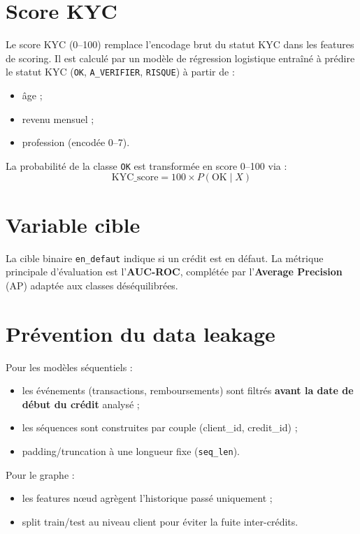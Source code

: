 \section{Score KYC}

Le score KYC (0--100) remplace l'encodage brut du statut KYC dans les features de scoring. Il est calculé par un modèle de régression logistique entraîné à prédire le statut KYC (\texttt{OK}, \texttt{A\_VERIFIER}, \texttt{RISQUE}) à partir de :
\begin{itemize}[leftmargin=*]
  \item âge ;
  \item revenu mensuel ;
  \item profession (encodée 0--7).
\end{itemize}

La probabilité de la classe \texttt{OK} est transformée en score 0--100 via :
\[
\text{KYC\_score} = 100 \times P(\text{OK} \mid X)
\]

\section{Variable cible}

La cible binaire \texttt{en\_defaut} indique si un crédit est en défaut. La métrique principale d'évaluation est l'\textbf{AUC-ROC}, complétée par l'\textbf{Average Precision} (AP) adaptée aux classes déséquilibrées.

\section{Prévention du data leakage}

Pour les modèles séquentiels :
\begin{itemize}[leftmargin=*]
  \item les événements (transactions, remboursements) sont filtrés \textbf{avant la date de début du crédit} analysé ;
  \item les séquences sont construites par couple (client\_id, credit\_id) ;
  \item padding/truncation à une longueur fixe (\texttt{seq\_len}).
\end{itemize}

Pour le graphe :
\begin{itemize}[leftmargin=*]
  \item les features nœud agrègent l'historique passé uniquement ;
  \item split train/test au niveau client pour éviter la fuite inter-crédits.
\end{itemize}

